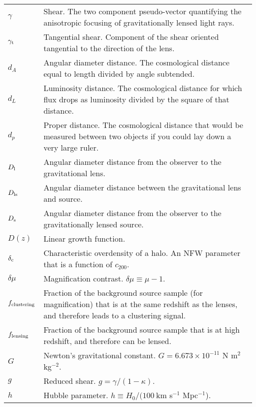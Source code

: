 \section*{\underline{}}
\vspace{-0.5cm}
\begin{tabular}{p{0.6in}p{5.8in}}

$\gamma$ & Shear. The two component pseudo-vector quantifying the anisotropic focusing of gravitationally lensed light rays. \\
$\gamma_{\rm t}$ & Tangential shear. Component of the shear oriented tangential to the direction of the lens. \\
$d_A$ & Angular diameter distance. The cosmological distance equal to length divided by angle subtended. \\
$d_L$ & Luminosity distance. The cosmological distance for which flux drops as luminosity divided by the square of that distance. \\
$d_p$ & Proper distance. The cosmological distance that would be measured between two objects if you could lay down a very large ruler. \\
$D_{\rm l}$ & Angular diameter distance from the observer to the gravitational lens. \\
$D_{\rm ls}$ & Angular diameter distance between the gravitational lens and source. \\
$D_{\rm s}$ & Angular diameter distance from the observer to the gravitationally lensed source. \\
$D(z)$ & Linear growth function. \\
$\delta_{\rm c}$ & Characteristic overdensity of a halo. An \acs{NFW} parameter that is a function of $c_{200}$. \\
$\delta\mu$ & Magnification contrast. $\delta\mu \equiv \mu -1$. \\
$f_{\rm clustering}$ & Fraction of the background source sample (for magnification) that is at the same redshift as the lenses, and therefore leads to a clustering signal. \\
$f_{\rm lensing}$ & Fraction of the background source sample that is at high redshift, and therefore can be lensed. \\
$G$ & Newton's gravitational constant. $G = 6.673 \times 10^{-11}$ N m$^2$ kg$^{-2}$.\\
$g$ & Reduced shear. $g = \gamma/(1-\kappa)$. \\
$h$ & Hubble parameter. $h \equiv H_0/(100\ $km s$^{-1}$ Mpc$^{-1}$). \\

\end{tabular}
